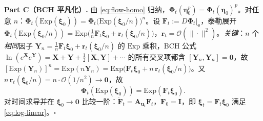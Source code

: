 \begin{derivation}
\textbf{Part C（BCH 平凡化）.}\; 由 \cref{eq:flow-homo} 归纳，$\boldsymbol{\Phi}_t(\boldsymbol{\eta}_0^p)=\boldsymbol{\Phi}_t(\boldsymbol{\eta}_0)^p$。对任意 $n$：$\boldsymbol{\Phi}_t(\mathrm{Exp}(\boldsymbol{\xi}_0))=\boldsymbol{\Phi}_t\big(\mathrm{Exp}(\boldsymbol{\xi}_0/n)\big)^n$。设 $\mathbf{F}_t:=D\boldsymbol{\Phi}_t|_{\mathbf{e}}$，泰勒展开 $\boldsymbol{\Phi}_t(\mathrm{Exp}(\boldsymbol{\xi}_0/n))=\mathrm{Exp}\big(\tfrac1n\mathbf{F}_t\boldsymbol{\xi}_0+\mathbf{r}_t(\boldsymbol{\xi}_0/n)\big)$，$\mathbf{r}_t=\mathcal{O}(\|\cdot\|^2)$。\emph{关键}：$n$ 个\emph{相同}因子 $\mathbf{Y}_n=\tfrac1n\mathbf{F}_t\boldsymbol{\xi}_0+\mathbf{r}_t(\boldsymbol{\xi}_0/n)$ 的 $\mathrm{Exp}$ 乘积，BCH 公式 $\ln(e^{\mathbf{X}}e^{\mathbf{Y}})=\mathbf{X}+\mathbf{Y}+\tfrac12[\mathbf{X},\mathbf{Y}]+\cdots$ 的所有交叉项都含 $[\mathbf{Y}_n,\mathbf{Y}_n]=\mathbf{0}$，故 $[\mathrm{Exp}(\mathbf{Y}_n)]^n=\mathrm{Exp}(n\mathbf{Y}_n)=\mathrm{Exp}\big(\mathbf{F}_t\boldsymbol{\xi}_0+n\,\mathbf{r}_t(\boldsymbol{\xi}_0/n)\big)$。又 $n\,\mathbf{r}_t(\boldsymbol{\xi}_0/n)=n\cdot\mathcal{O}(1/n^2)\to\mathbf{0}$，故
\begin{equation}
  \boldsymbol{\Phi}_t(\mathrm{Exp}(\boldsymbol{\xi}_0))=\mathrm{Exp}(\mathbf{F}_t\boldsymbol{\xi}_0).
  \label{eq:flow-exp-linear}
\end{equation}
对时间求导并在 $\boldsymbol{\xi}_0\to\mathbf{0}$ 比较一阶：$\dot{\mathbf{F}}_t=\mathbf{A}_{\mathbf{u}_t}\mathbf{F}_t$，$\mathbf{F}_0=\mathbf{I}$，即 $\boldsymbol{\xi}_t=\mathbf{F}_t\boldsymbol{\xi}_0$ 满足 \cref{eq:log-linear}。$\square$
\end{derivation}


